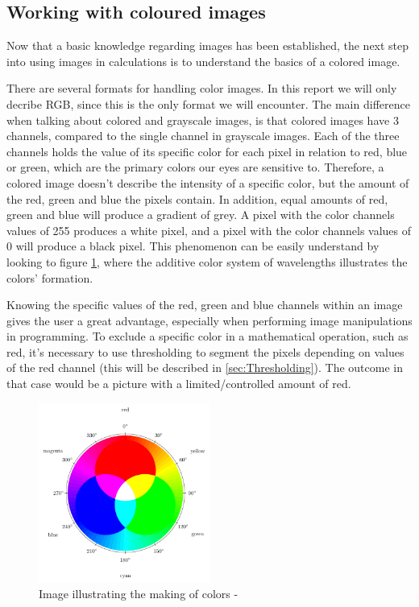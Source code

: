 \subsection{Working with coloured images}
Now that a basic knowledge regarding images has been established, the next step into using images in calculations is to understand the basics of a colored image.

There are several formats for handling color images. In this report we will only decribe RGB, since this is the only format we will encounter. The main difference when talking about colored and grayscale images, is that colored images have 3 channels, compared to the single channel in grayscale images. Each of the three channels holds the value of its specific color for each pixel in relation to red, blue or green, which are the primary colors our eyes are sensitive to. Therefore, a colored image doesn't describe the intensity of a specific color, but the amount of the red, green and blue the pixels contain. In addition, equal amounts of red, green and blue will produce a gradient of grey. A pixel with the color channels values of 255 produces a white pixel, and a pixel with the color channels values of 0 will produce a black pixel. This phenomenon can be easily understand by looking to figure \ref{fig:ip_ColorWheel}, where the additive color system of wavelengths illustrates the colors' formation.

Knowing the specific values of the red, green and blue channels within an image gives the user a great advantage, especially when performing image manipulations in programming. To exclude a specific color in a mathematical operation, such as red, it's necessary to use thresholding to segment the pixels depending on values of the red channel (this will be described in \ref{sec:Thresholding}). The outcome in that case would be a picture with a limited/controlled amount of red.

\begin{figure}[htbp]
\centering
\includegraphics[width=0.50\textwidth]{Pictures/Theory/RGBColor.pdf}
\caption{Image illustrating the making of colors - \citep{colorMixing}}
\label{fig:ip_ColorWheel}
\end{figure} 


